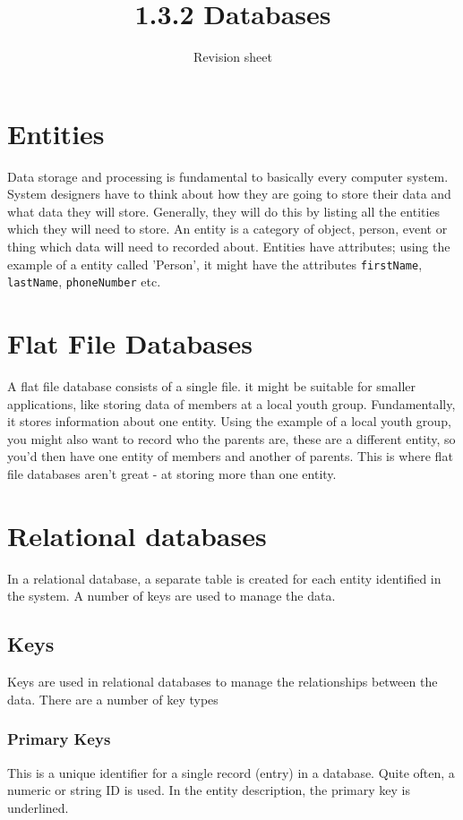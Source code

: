 \documentclass[a4paper,11pt, twocolumn]{article}
\title{1.3.2 Databases}
\author{Revision sheet}
\date{}
\begin{document}
\maketitle
\thispagestyle{fancy}

\section{Entities}
Data storage and processing is fundamental to basically every computer system. System designers have to think about how they are going to store their data and what data they will store. Generally, they will do this by listing all the entities which they will need to store. An entity is a category of object, person, event or thing which data will need to recorded about. Entities have attributes; using the example of a entity called 'Person', it might have the attributes \verb|firstName|, \verb|lastName|, \verb|phoneNumber| etc.

\section{Flat File Databases}
A flat file database consists of a single file. it might be suitable for smaller applications, like storing data of members at a local youth group. Fundamentally, it stores information about one entity. Using the example of a local youth group, you might also want to record who the parents are, these are a different entity, so you'd then have one entity of members and another of parents. This is where flat file databases aren't great - at storing more than one entity.

\section{Relational databases}
In a relational database, a separate table is created for each entity identified in the system. A number of keys are used to manage the data.
\subsection{Keys}
Keys are used in relational databases to manage the relationships between the data. There are a number of key types
\subsubsection{Primary Keys}
This is a unique identifier for a single record (entry) in a database. Quite often, a numeric or string ID is used. In the entity description, the primary key is underlined.
\end{document}
